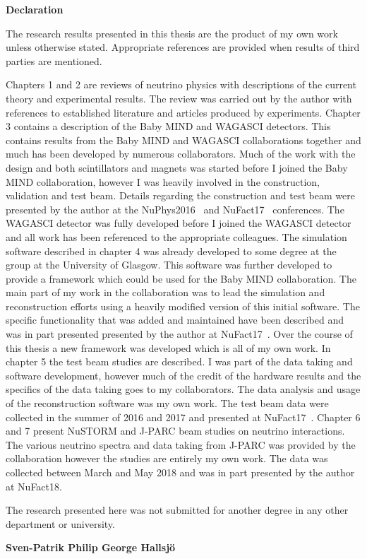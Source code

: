 \vspace*{0.75in}
\begin{center} {\bf Declaration}\end{center}


The research results presented in this thesis are the product of my own work unless otherwise stated. Appropriate references are provided when results of third parties are mentioned. 

Chapters 1 and 2 are reviews of neutrino physics with descriptions of the current theory and experimental results. The review was carried out by the author with references to established literature and articles produced by experiments. Chapter 3 contains a description of the Baby MIND and WAGASCI detectors. This contains results from the Baby MIND and WAGASCI collaborations together and much has been developed by numerous collaborators. Much of the work with the design and both scintillators and magnets was started before I joined the Baby MIND collaboration, however I was heavily involved in the construction, validation and test beam. Details regarding the construction and test beam were presented by the author at the NuPhys2016~\cite{51Saba, 54NUFACT2016Hallsjo} and NuFact17~\cite{82Uppsala} conferences. The WAGASCI detector was fully developed before I joined the WAGASCI detector and all work has been referenced to the appropriate colleagues. The simulation software described in chapter 4 was already developed to some degree at the group at the University of Glasgow. This software was further developed to provide a framework which could be used for the Baby MIND collaboration. The main part of my work in the collaboration was to lead the simulation and reconstruction efforts using a heavily modified version of this initial software. The specific functionality that was added and maintained have been described and was in part presented presented by the author at NuFact17~\cite{82Uppsala}. Over the course of this thesis a new framework was developed which is all of my own work. In chapter 5 the test beam studies are described. I was part of the data taking and software development, however much of the credit of the hardware results and the specifics of the data taking goes to my collaborators. The data analysis and usage of the reconstruction software was my own work. The test beam data were collected in the summer of 2016 and 2017 and presented at NuFact17~\cite{82Uppsala}. Chapter 6 and 7 present NuSTORM and J-PARC beam studies on neutrino interactions. The various neutrino spectra and data taking from J-PARC was provided by the collaboration however the studies are entirely my own work. The data was collected between March and May 2018 and was in part presented by the author at NuFact18.

The research presented here was not submitted for another degree in any other department or university.


\begin{flushright} \textbf{Sven-Patrik Philip George Hallsj{\"o}}\end{flushright}
